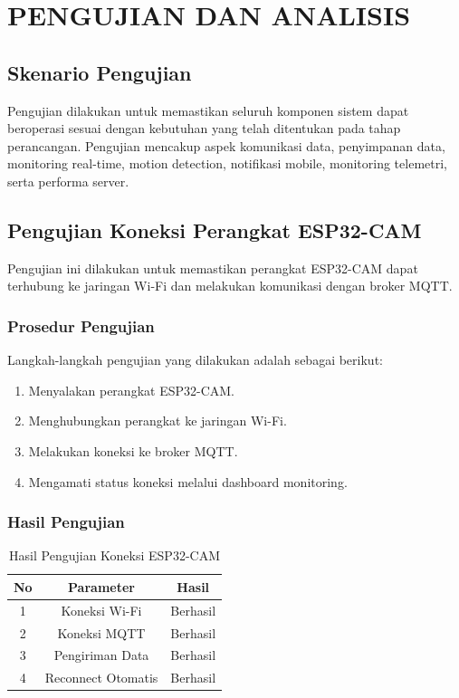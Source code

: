 \chapter{PENGUJIAN DAN ANALISIS}
\label{sec:chap4_pengujian}

\section{Skenario Pengujian}

Pengujian dilakukan untuk memastikan seluruh komponen sistem dapat beroperasi sesuai dengan kebutuhan yang telah ditentukan pada tahap perancangan. Pengujian mencakup aspek komunikasi data, penyimpanan data, monitoring real-time, motion detection, notifikasi mobile, monitoring telemetri, serta performa server.

\section{Pengujian Koneksi Perangkat ESP32-CAM}

Pengujian ini dilakukan untuk memastikan perangkat ESP32-CAM dapat terhubung ke jaringan Wi-Fi dan melakukan komunikasi dengan broker MQTT.

\subsection{Prosedur Pengujian}

Langkah-langkah pengujian yang dilakukan adalah sebagai berikut:

\begin{enumerate}
	\item Menyalakan perangkat ESP32-CAM.
	\item Menghubungkan perangkat ke jaringan Wi-Fi.
	\item Melakukan koneksi ke broker MQTT.
	\item Mengamati status koneksi melalui dashboard monitoring.
\end{enumerate}

\subsection{Hasil Pengujian}

\begin{table}[H]
	\centering
	\caption{Hasil Pengujian Koneksi ESP32-CAM}
	\begin{tabular}{|c|c|c|}
		\hline
		No & Parameter & Hasil \\
		\hline
		1 & Koneksi Wi-Fi & Berhasil \\
		2 & Koneksi MQTT & Berhasil \\
		3 & Pengiriman Data & Berhasil \\
		4 & Reconnect Otomatis & Berhasil \\
		\hline
	\end{tabular}
\end{table}

